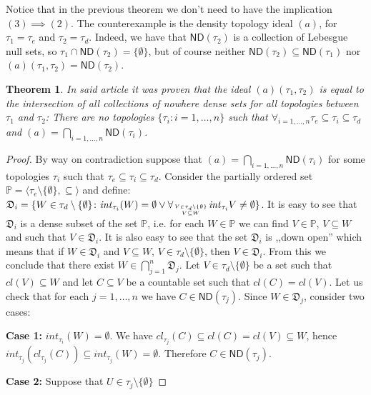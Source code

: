 \documentclass[12pt]{amsart}
\theoremstyle{plain}
\newtheorem{theorem}{Theorem}[section]
\theoremstyle{definition}
\theoremstyle{remark}
\newcommand{\cl}{\mathit{cl}}
\newcommand{\aideal}{\mathit{(a)}}
\newcommand{\ND}{\mathsf{ND}}
\begin{document}
Notice that in the previous theorem we don't need to have
the implication $(3) \implies (2)$. The counterexample 
is the density topology ideal $\aideal$, for $\tau_1 = \tau_e$
and $\tau_2 = \tau_d$. Indeed, we have 
that $\mathsf{ND}(\tau_2)$ is a collection of Lebesgue null sets, 
so $\tau_1 \cap \mathsf{ND}(\tau_2) = \lbrace \emptyset \rbrace$,
but of course neither $\mathsf{ND}(\tau_2) \subseteq \mathsf{ND}(\tau_1)$ 
nor $\aideal(\tau_1, \tau_2) = \mathsf{ND}(\tau_2)$.


\begin{theorem}
In said article it was proven that the ideal $\aideal(\tau_1, \tau_2)$
is equal to the intersection of all collections of nowhere dense sets
for all topologies between $\tau_1$ and $\tau_2$:
There are no topologies $\lbrace \tau_i \colon i = 1,\ldots, n\rbrace$
such that $\forall_{i = 1,\ldots, n} \tau_e \subseteq \tau_i \subseteq \tau_d$
and 
$\aideal = \bigcap_{i=1,\ldots,n} \ND(\tau_i)$.
\end{theorem}

\begin{proof}
By way on contradiction suppose that 
$\aideal = \bigcap_{i=1,\ldots,n} \ND(\tau_i)$ for some topologies 
 $\tau_i$ such that $\tau_e \subseteq \tau_i \subseteq \tau_d$.
Consider the partially ordered set 
$\mathbb{P} = \langle \tau_e\setminus\lbrace\emptyset\rbrace, \subseteq\rangle$
and define:
$\mathfrak{D}_i = \lbrace W \in \tau_d\setminus\lbrace\emptyset\rbrace \colon
\mathit{int}_{\tau_i}(W) = \emptyset \vee \forall_{V \in \tau_d\setminus\lbrace\emptyset\rbrace \atop V \subseteq W} \mathit{int}_{\tau_i} V \not= \emptyset\rbrace$.
It is easy to see that $\mathfrak{D}_i$ is a dense subset of 
the set $\mathbb{P}$, i.e. for each $W \in \mathbb{P}$ we can find
$V \in \mathbb{P}$, $V \subseteq W$ and such that $V \in \mathfrak{D}_i$. It is also
easy to see that the set 
$\mathfrak{D}_i$ is ,,down open'' which means that if
$W \in \mathfrak{D}_i$ and 
$V \subseteq W$, $V\in\tau_d\setminus\lbrace\emptyset\rbrace$, then $V \in \mathfrak{D}_i$. From this we conclude that there exist $W \in \bigcap_{j=1}^n \mathfrak{D}_j$. Let
$V \in \tau_d\setminus\lbrace\emptyset\rbrace$ be a set such that 
$\cl(V) \subseteq W$ and let $C \subseteq V$ be a countable set
such that $\cl(C) = \cl(V)$. Let us check that for each $j = 1,\ldots,n$
we have $C \in \ND(\tau_j)$. 
Since $W \in \mathfrak{D}_j$, consider two cases:

{\bf Case 1:} $\mathit{int}_{\tau_i}(W) = \emptyset$.
We have $\cl_{\tau_j}(C) \subseteq \cl(C) = \cl(V) \subseteq W$, hence
$\mathit{int}_{\tau_j}(\cl_{\tau_j}(C)) \subseteq \mathit{int}_{\tau_j}(W) = \emptyset$.
Therefore $C \in \ND(\tau_j)$.

{\bf Case 2:}
Suppose that $U\in \tau_j\setminus\lbrace\emptyset\rbrace$

\end{proof}
\end{document}
